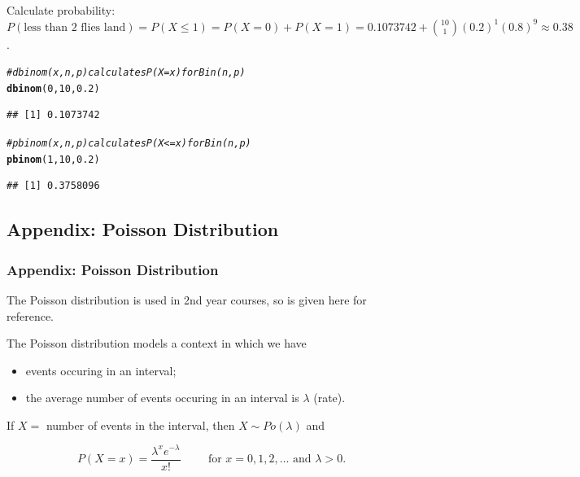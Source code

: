 \documentclass[t,xcolor=pdftex,dvipsnames,table]{beamer}
\makeatletter
\newcommand{\hlnum}[1]{\textcolor[rgb]{0.686,0.059,0.569}{#1}}%
\newcommand{\hlcom}[1]{\textcolor[rgb]{0.678,0.584,0.686}{\textit{#1}}}%
\newcommand{\hlstd}[1]{\textcolor[rgb]{0.345,0.345,0.345}{#1}}%
\newcommand{\hlkwd}[1]{\textcolor[rgb]{0.737,0.353,0.396}{\textbf{#1}}}%
\newenvironment{kframe}{%
 \def\at@end@of@kframe{}%
 \ifinner\ifhmode%
  \def\at@end@of@kframe{\end{minipage}}%
  \begin{minipage}{\columnwidth}%
 \fi\fi%
 \def\FrameCommand##1{\hskip\@totalleftmargin \hskip-\fboxsep
 \colorbox{shadecolor}{##1}\hskip-\fboxsep
     \hskip-\linewidth \hskip-\@totalleftmargin \hskip\columnwidth}%
 \MakeFramed {\advance\hsize-\width
   \@totalleftmargin\z@ \linewidth\hsize
   \@setminipage}}%
 {\par\unskip\endMakeFramed%
 \at@end@of@kframe}
\newenvironment{knitrout}{}{} %
\makeatother
\begin{document}
\begin{frame}[fragile]\frametitle{}
\begin{block}{}
Calculate probability:  \\
$P(\mbox{less than 2 flies land}) = P(X \leq 1) = P(X=0) +P(X=1) = 0.1073742 + {10 \choose 1} (0.2)^1 (0.8)^9 \approx 0.38$.
\end{block}

\begin{knitrout}
\color{fgcolor}\begin{kframe}
\begin{alltt}
\hlcom{# dbinom(x,n,p) calculates P(X=x) for Bin(n,p)}
\hlkwd{dbinom}\hlstd{(}\hlnum{0}\hlstd{,}\hlnum{10}\hlstd{,}\hlnum{0.2}\hlstd{)}
\end{alltt}
\begin{verbatim}
## [1] 0.1073742
\end{verbatim}
\end{kframe}
\end{knitrout}

\begin{knitrout}
\color{fgcolor}\begin{kframe}
\begin{alltt}
\hlcom{# pbinom(x,n,p) calculates P(X<=x) for Bin(n,p)}
\hlkwd{pbinom}\hlstd{(}\hlnum{1}\hlstd{,}\hlnum{10}\hlstd{,}\hlnum{0.2}\hlstd{)}
\end{alltt}
\begin{verbatim}
## [1] 0.3758096
\end{verbatim}
\end{kframe}
\end{knitrout}
\end{frame}


\subsection{Appendix: Poisson Distribution}
\begin{frame}\frametitle{Appendix: Poisson Distribution}

The Poisson distribution is used in 2nd year courses, so is given here for reference.

\begin{definition}
The \alert{Poisson distribution} models a context in which we have
\begin{itemize}
\item events occuring in an interval; 
\item the average number of events occuring in an interval is $\lambda$ (rate).
\end{itemize}

\vspace{.5cm}
If $X =$ number of events in the interval, then $X \sim Po(\lambda)$ and

\[ P(X=x) =   \frac{ \lambda^x e^{-\lambda}}{x!} 
\hspace{1cm} \mbox{for } x=0,1,2,\ldots \mbox{ and } \lambda > 0. \]
\end{definition}
\end{frame}
\end{document}
